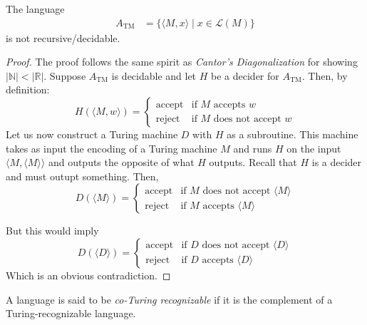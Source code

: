 \begin{proposition}
    The language
    \begin{align*}
        A_\text{TM} &= \{\langle M,x\rangle\mid x\in\mathcal{L}(M)\}
    \end{align*}
    is not recursive/decidable.
\end{proposition}
\begin{proof}
    The proof follows the same spirit as \textit{Cantor's Diagonalization} for showing $|\mathbb{N}| < |\mathbb{R}|$. Suppose $A_\text{TM}$ is decidable and let $H$ be a decider for $A_\text{TM}$. Then, by definition:
    \begin{equation*}
        H(\langle M,w\rangle) = 
        \begin{cases}
            \text{accept} & \text{if $M$ accepts $w$}\\
            \text{reject} & \text{if $M$ does not accept $w$}
        \end{cases}
    \end{equation*}
    Let us now construct a Turing machine $D$ with $H$ as a subroutine. This machine takes as input the encoding of a Turing machine $M$ and runs $H$ on the input $\langle M, \langle M\rangle\rangle$ and outputs the opposite of what $H$ outputs. Recall that $H$ is a decider and must outupt something. Then, 
    \begin{equation*}
        D(\langle M\rangle) = 
        \begin{cases}
            \text{accept} & \text{if $M$ does not accept $\langle M\rangle$}\\
            \text{reject} & \text{if $M$ accepts $\langle M\rangle$}
        \end{cases}
    \end{equation*}

    But this would imply
    \begin{equation*}
        D(\langle D\rangle) = 
        \begin{cases}
            \text{accept} & \text{if $D$ does not accept $\langle D\rangle$}\\
            \text{reject} & \text{if $D$ accepts $\langle D\rangle$}
        \end{cases}
    \end{equation*}
    Which is an obvious contradiction.
\end{proof}

A language is said to be \textit{co-Turing recognizable} if it is the complement of a Turing-recognizable language.

